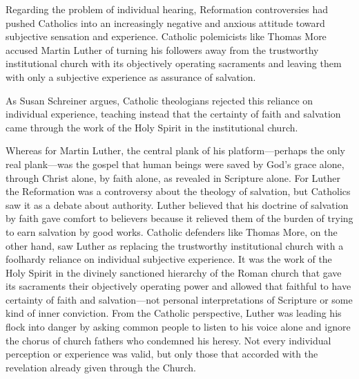 Regarding the problem of individual hearing, Reformation controversies had
pushed Catholics into an increasingly negative and anxious attitude toward
subjective sensation and experience.
Catholic polemicists like Thomas More accused Martin Luther of turning his
followers away from the trustworthy institutional church with its objectively
operating sacraments and leaving them with only a subjective experience as
assurance of salvation.


As Susan Schreiner argues, Catholic theologians rejected this reliance on
individual experience, teaching instead that the certainty of faith and
salvation came through the work of the Holy Spirit in the institutional church.%
    \Autocite[131--208]{Schreiner:Certainty}

Whereas for Martin Luther, the central plank of his platform---perhaps the only
real plank---was the gospel that human beings were saved by God's grace alone,
through Christ alone, by faith alone, as revealed in Scripture alone.
For Luther the Reformation was a controversy about the theology of salvation,
but Catholics saw it as a debate about authority.%
    \Autocite{Schreiner:Certainty}
Luther believed that his doctrine of salvation by faith gave comfort to
believers because it relieved them of the burden of trying to earn salvation by
good works.%
Catholic defenders like Thomas More, on the other hand, saw Luther as replacing
the trustworthy institutional church with a foolhardy reliance on individual
subjective experience.%
It was the work of the Holy Spirit in the divinely sanctioned hierarchy of the
Roman church that gave its sacraments their objectively operating power and
allowed that faithful to have certainty of faith and salvation---not personal
interpretations of Scripture or some kind of inner conviction.%
    \Autocite[131--208]{Schreiner:Certainty}
From the Catholic perspective, Luther was leading his flock into danger by
asking common people to listen to his voice alone and ignore the chorus of
church fathers who condemned his heresy.
Not every individual perception or experience was valid, but only those that
accorded with the revelation already given through the Church.


